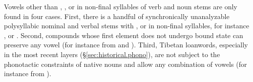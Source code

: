 Vowels other than , , or  in non-final syllables of verb and noun stems are only found in four cases. First, there is a handful of synchronically unanalyzable polysyllabic nominal and verbal stems with ,  or  in non-final syllables, for instance ,  or . Second, compounds whose first element does not undergo bound state can preserve any vowel (for instance  from  and ). Third,  Tibetan loanwords, especially in the most recent layers (§\ref{sec:historical.phono}), are not subject to the phonotactic constraints of native nouns and allow any combination of vowels (for instance  from ).

